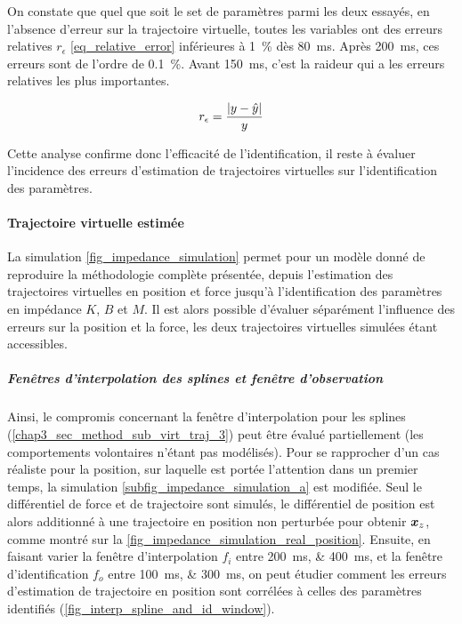 

On constate que quel que soit le set de paramètres parmi les deux essayés, en l'absence d'erreur sur la trajectoire virtuelle, toutes les variables ont des erreurs relatives $r_\epsilon$ \cref{eq_relative_error} inférieures à \SI{1}{\percent} dès \SI{80}{\milli\second}. Après \SI{200}{\milli\second}, ces erreurs sont de l'ordre de \SI{0.1}{\percent}. Avant \SI{150}{\milli\second}, c'est la raideur qui a les erreurs relatives les plus importantes.

\begin{equation} \label{eq_relative_error}
r_\epsilon = \frac{\left\lvert y - \hat{y}\right\rvert}{y}
\end{equation}

Cette analyse confirme donc l'efficacité de l'identification, il reste à évaluer l'incidence des erreurs d'estimation de trajectoires virtuelles sur l'identification des paramètres.

\paragraph{Trajectoire virtuelle estimée} \label{chap3_sec_method_sub_ident_2_2}

La simulation \cref{fig_impedance_simulation} permet pour un modèle donné de reproduire la méthodologie complète présentée, depuis l'estimation des trajectoires virtuelles en position et force jusqu'à l'identification des paramètres en impédance $K$, $B$ et $M$. Il est alors possible d'évaluer séparément l'influence des erreurs sur la position et la force, les deux trajectoires virtuelles simulées étant accessibles. 

\subparagraph{Fenêtres d'interpolation des splines et fenêtre d'observation}

Ainsi, le compromis concernant la fenêtre d'interpolation pour les splines (\cref{chap3_sec_method_sub_virt_traj_3}) peut être évalué partiellement (les comportements volontaires n'étant pas modélisés). Pour se rapprocher d'un cas réaliste pour la position, sur laquelle est portée l'attention dans un premier temps, la simulation \cref{subfig_impedance_simulation_a} est modifiée. Seul le différentiel de force et de trajectoire sont simulés, le différentiel de position est alors additionné à une trajectoire en position non perturbée pour obtenir $\vect{x}_z$, comme montré sur la \cref{fig_impedance_simulation_real_position}. Ensuite, en faisant varier la fenêtre d'interpolation $f_i$ entre \SIlist{200;400}{\milli\second}, et la fenêtre d'identification $f_o$ entre \SIlist{100;300}{\milli\second}, on peut étudier comment les erreurs d'estimation de trajectoire en position sont corrélées à celles des paramètres identifiés (\cref{fig_interp_spline_and_id_window}).

